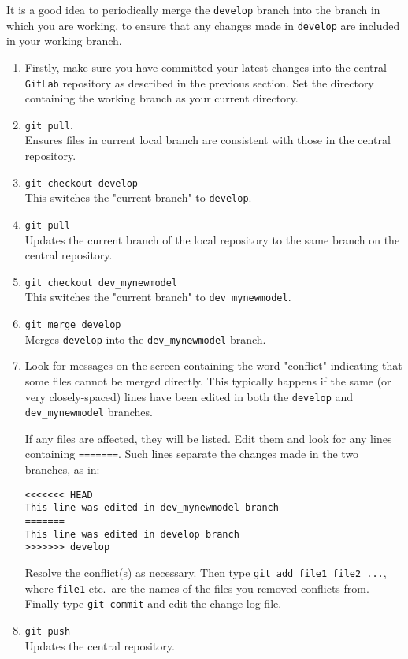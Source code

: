 It is a good idea to periodically merge the \texttt{develop} branch into the branch in which you are working, to ensure that any changes made in \texttt{develop} are included in your working branch.
\begin{enumerate}

\item Firstly, make sure you have committed your latest changes into the
  central \texttt{GitLab} repository as described in the previous section.  Set the directory containing the working branch as your current directory.

\item \texttt{git pull}.  \\
Ensures files in current local branch are consistent with those in the central repository.

\item \texttt{git checkout develop}  \\
This switches the "current branch" to \texttt{develop}.

\item \texttt{git pull} \\
Updates the current branch of the local repository to the same branch on the central repository.

\item \texttt{git checkout dev\_mynewmodel}  \\
This switches the "current branch" to \texttt{dev\_mynewmodel}.

\item \texttt{git merge develop} \\
Merges \texttt{develop} into the \texttt{dev\_mynewmodel} branch.

\item Look for messages on the screen containing the word "conflict" indicating that some files cannot be merged directly. This typically happens if the
  same (or very closely-spaced) lines have been edited in both the
  \texttt{develop} and \texttt{dev\_mynewmodel} branches.

  If any files are affected, they will be listed.  Edit them and look for any lines containing  \texttt{=======}. Such lines separate the changes made in the two branches, as in:
\begin{verbatim}
<<<<<<< HEAD
This line was edited in dev_mynewmodel branch
=======
This line was edited in develop branch
>>>>>>> develop
\end{verbatim}
  Resolve the conflict(s) as necessary. Then type \texttt{git add file1 file2 ...}, where
  \texttt{file1} etc.\ are the names of the files you removed conflicts
  from. Finally type \texttt{git commit} and edit the change log file.

\item \texttt{git push} \\
Updates the central repository.

\end{enumerate}

